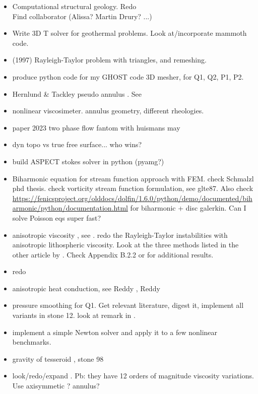 \documentclass[a4paper]{article}
\begin{document}
\begin{itemize}
\item Computational structural geology. Redo  \\
Find collaborator (Alissa? Martin Drury? ...)
\item Write 3D T solver for geothermal problems. Look at/incorporate
mammoth code.
\item \textcite{vaks97} (1997) Rayleigh-Taylor problem with triangles, and remeshing.
\item produce python code for my GHOST code \textcite{thie18} 3D mesher, for Q1, Q2, P1, P2.
\item Hernlund \& Tackley pseudo annulus . See \textcite{josv21}
\item nonlinear viscosimeter. annulus geometry, different rheologies.
\item paper 2023 two phase flow fantom with huismans may
\item dyn topo vs true free surface... who wins?
\item build ASPECT stokes solver in python (pyamg?)
\item Biharmonic equation for stream function approach with FEM. check Schmalzl phd thesis.
check vorticity stream function formulation, see glte87.
Also check \url{https://fenicsproject.org/olddocs/dolfin/1.6.0/python/demo/documented/biharmonic/python/documentation.html} for biharmonic + disc galerkin. Can I solve Poisson eqs super fast?
\item anisotropic viscosity , see \textcite{leha08}.
redo the Rayleigh-Taylor instabilities with 
anisotropic lithospheric viscosity.
Look at the three methods listed in the other article by \textcite{leha08b}. 
Check Appendix B.2.2 or \textcite{perr19} for additional results.

\item redo 
\item anisotropic heat conduction, see  Reddy \cite[p121]{reddybook2}, Reddy \cite[p143]{reddybook2} 
\item pressure smoothing for Q1. Get relevant literature, digest it, implement all variants in stone 12.
look at remark in \textcite{lumh24}.

\item implement a simple Newton solver and apply it to a few nonlinear  benchmarks. 

\item gravity of tesseroid , stone 98
\item look/redo/expand . Pb: they have 12 orders of magnitude viscosity variations.
Use axisymmetic ? annulus?


\end{itemize}
\end{document}
